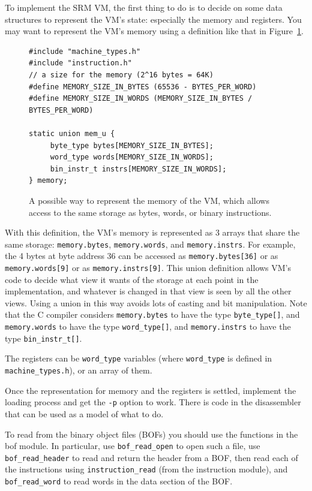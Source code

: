 \documentclass[11pt,letterpaper]{article}
\newcommand{\figref}[1]{Figure~\ref{#1}}  %
\begin{document}
To implement the SRM VM, the first thing to do is to decide on some
data structures to represent the VM's state: especially the memory and
registers.  You may want to represent the VM's memory using a
definition like that in \figref{fig:memoryrep}.
\begin{figure}[hbtp]
\begin{lstlisting}
#include "machine_types.h"
#include "instruction.h"
// a size for the memory (2^16 bytes = 64K)
#define MEMORY_SIZE_IN_BYTES (65536 - BYTES_PER_WORD)
#define MEMORY_SIZE_IN_WORDS (MEMORY_SIZE_IN_BYTES / BYTES_PER_WORD)

static union mem_u {
     byte_type bytes[MEMORY_SIZE_IN_BYTES];
     word_type words[MEMORY_SIZE_IN_WORDS];
     bin_instr_t instrs[MEMORY_SIZE_IN_WORDS];
} memory;
\end{lstlisting}
\caption{A possible way to represent the memory of the VM, which
  allows access to the same storage as bytes, words, or binary instructions.}
\label{fig:memoryrep}
\end{figure}
With this definition,
the VM's memory is represented as 3 arrays that share the same
storage: \lstinline!memory.bytes!, \lstinline!memory.words!, and
\lstinline!memory.instrs!.  For example,
the 4 bytes at byte address 36 can be accessed as
\lstinline!memory.bytes[36]!
or as \lstinline!memory.words[9]! or as \lstinline!memory.instrs[9]!.
This union definition allows VM's code to decide what view it wants
of the storage at each point in the implementation,
and whatever is changed in that view is
seen by all the other views.
Using a union in this way avoids lots of casting and bit manipulation.
Note that the C compiler considers \lstinline!memory.bytes! to have
the type \lstinline!byte_type[]!,
and \lstinline!memory.words! to have the type \lstinline!word_type[]!,
and \lstinline!memory.instrs! to have the type \lstinline!bin_instr_t[]!.

The registers can be \lstinline!word_type! variables
(where \lstinline!word_type! is defined in
\lstinline!machine_types.h!),
or an array of them.

Once the representation for memory and the registers is settled,
implement the loading process and get the \texttt{-p} option to work.
There is code in the disassembler that can be used as a model of what
to do.

To read from the binary object files (BOFs) you should use the
functions in the bof module.
In particular, use \lstinline!bof_read_open! to open such a file,
use \lstinline!bof_read_header! to read and return the header from a
BOF, then read each of the instructions using
\lstinline!instruction_read! (from the instruction module),
and \lstinline!bof_read_word! to read words in the data section of
the BOF.
\end{document}
